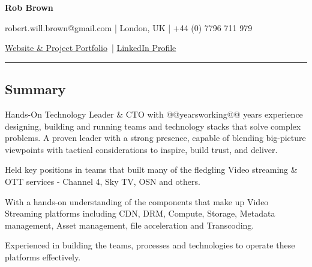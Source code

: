\documentclass[10pt,a4paper]{article}
\begin{document}
\begin{center}
  {\LARGE \textbf{Rob Brown}}

  robert.will.brown@gmail.com |
  London, UK |
  +44 (0) 7796 711 979

  \href{https://robert-will-brown.github.io}{Website \& Project Portfolio}\ |
  \href{https://www.linkedin.com/in/robert-w-brown/}{LinkedIn Profile}


\end{center}

\hrule
\vspace{-0.4em}
\subsection*{Summary}

\begin{itemize*}
\item[] Hands-On Technology Leader \& CTO with @@yearsworking@@ years experience designing, building and running teams and technology stacks that solve complex problems. A proven leader with a strong presence, capable of blending big-picture viewpoints with tactical considerations to inspire, build trust, and deliver.

\vspace{+0.4em}
Held key positions in teams that built many of the fledgling Video streaming \& OTT services - Channel 4, Sky TV, OSN and others.

\vspace{+0.4em}
With a hands-on understanding of the components that make up Video Streaming platforms including CDN, DRM, Compute, Storage, Metadata management, Asset management, file acceleration and Transcoding.

\vspace{+0.4em}
Experienced in building the teams, processes and technologies to operate these platforms effectively.

\end{itemize*}
\end{document}

